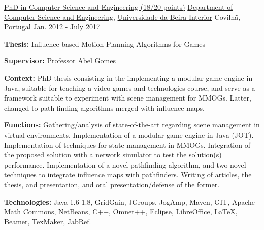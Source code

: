 

\begin{cventries}

  \cventry
    {\href{https://www.ubi.pt/en/course/849}{PhD in Computer Science and Engineering (18/20 points)}} %
    {\href{https://www.di.ubi.pt/}{Department of Computer Science and Engineering}, \href{http://www.ubi.pt/}{Universidade da Beira Interior}} %
    {Covilh\~{a}, Portugal} %
    {Jan. 2012 - July 2017} %
    {
      \begin{cvitems} %
        \item {\textbf{Thesis:} Influence-based Motion Planning Algorithms for Games}
        \item {\textbf{Supervisor:} \href{http://www.di.ubi.pt/~agomes/}{Professor Abel Gomes}}
        \item {\textbf{Context:} PhD thesis consisting in the implementing a modular game engine in Java, suitable for teaching a video games and technologies course, and serve as a framework suitable to experiment with scene management for MMOGs. Latter, changed to path finding algorithms merged with influence maps.}
        \item {\textbf{Functions:} Gathering/analysis of state-of-the-art regarding scene management in virtual environments. Implementation of a modular game engine in Java (JOT). Implementation of techniques for state management in MMOGs. Integration of the proposed solution with a network simulator to test the solution(s) performance. Implementation of a novel pathfinding algorithm, and two novel techniques to integrate influence maps with pathfinders. Writing of articles, the thesis, and presentation, and oral presentation/defense of the former.}
        \item {\textbf{Technologies:} Java 1.6-1.8, GridGain, JGroups, JogAmp, Maven, GIT, Apache Math Commons, NetBeans, C++, Omnet++, Eclipse, LibreOffice, LaTeX, Beamer, TexMaker, JabRef.}
      \end{cvitems}
    }


\end{cventries}
